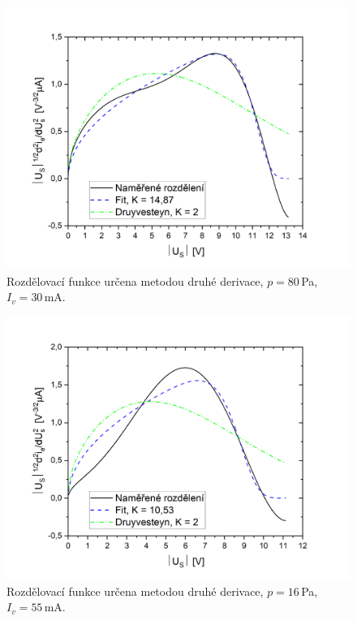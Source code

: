 \documentclass[a4paper,12pt]{article}
\begin{document}
\begin{figure}[h!]
	\centering
	\includegraphics[width=135mm]{rozdeleniD2G2V2.png}
	\caption{Rozdělovací funkce určena metodou druhé derivace, 
		$p=80$\,\si{\pascal}, $I_v = 30$\,\si{\milli\ampere}.}
	\label{rozdeleniD2G2}
\end{figure}

\begin{figure}[h!]
	\centering
	\includegraphics[width=135mm]{rozdeleniD2G3V2.png}
	\caption{Rozdělovací funkce určena metodou druhé derivace, 
		$p=16$\,\si{\pascal}, $I_v = 55$\,\si{\milli\ampere}.}
	\label{rozdeleniD2G3}
\end{figure}
\end{document}
